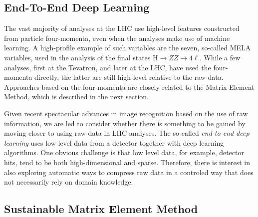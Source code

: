 \subsection{End-To-End Deep Learning}\label{subsec:endtoend}
\label{sec:applications-e2e}
The vast majority of analyses at the LHC use high-level features constructed from particle four-momenta, even when the analyses make use of machine learning. A high-profile example of such variables are the seven, so-called MELA variables, used in the analysis of the final states $\textrm{H} \rightarrow ZZ \rightarrow 4\ell$. While a few analyses, first at the Tevatron, and later at the LHC, have used the four-momenta directly, the latter are still high-level relative to the raw data. Approaches based on the four-momenta are closely related to the Matrix Element Method, which is described in the next section.

Given recent spectacular advances in image recognition based on the use of raw information, we are led to consider whether there is something to be gained by moving closer to using raw data in LHC analyses. The so-called \emph{end-to-end deep learning} uses low level data from a detector together with deep learning algorithms. One obvious challenge is that low level data, for example, detector hits, tend to be both high-dimensional and sparse. Therefore, there is interest in also exploring automatic ways to compress raw data in a controled way that does not necessarily rely on domain knowledge.


\subsection{Sustainable Matrix Element Method}
\label{sec:applications-MEM}



